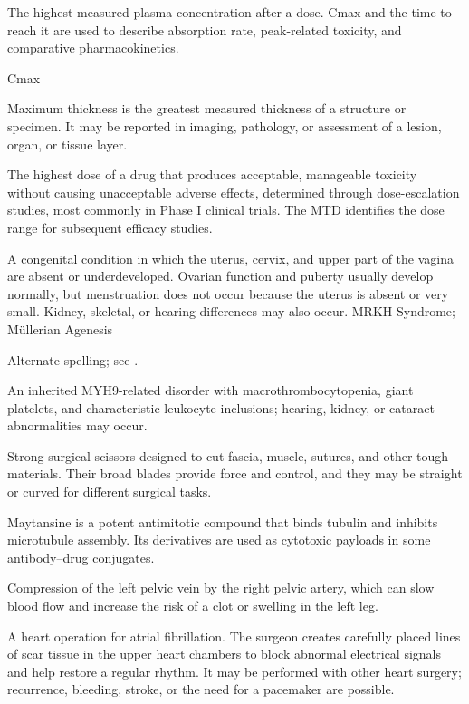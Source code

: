  The highest measured plasma concentration after a dose. Cmax and the time to reach it
are used to describe absorption rate, peak-related toxicity, and comparative
pharmacokinetics.

\synonyms
Cmax

 Maximum thickness is the greatest measured thickness of a structure or specimen. It may be reported in imaging, pathology, or assessment of a lesion, organ, or tissue layer.

 The highest dose of a drug that produces acceptable, manageable toxicity without causing
unacceptable adverse effects, determined through dose-escalation studies, most commonly
in Phase I clinical trials. The MTD identifies the dose range for subsequent efficacy
studies.

 A congenital condition in which the uterus, cervix, and upper part of the vagina are absent or underdeveloped. Ovarian function and puberty usually develop normally, but menstruation does not occur because the uterus is absent or very small. Kidney, skeletal, or hearing differences may also occur.
\synonyms
MRKH Syndrome; Müllerian Agenesis

 Alternate spelling; see .

 An inherited MYH9-related disorder with macrothrombocytopenia, giant platelets, and characteristic leukocyte inclusions; hearing, kidney, or cataract abnormalities may occur.

 Strong surgical scissors designed to cut fascia, muscle, sutures, and other tough materials. Their broad blades provide force and control, and they may be straight or curved for different surgical tasks.

 Maytansine is a potent antimitotic compound that binds tubulin and inhibits microtubule assembly. Its derivatives are used as cytotoxic payloads in some antibody--drug conjugates.

 Compression of the left pelvic vein by the right pelvic artery, which can slow blood flow and increase the risk of a clot or swelling in the left leg.

 A heart operation for atrial fibrillation. The surgeon creates carefully placed lines of scar tissue in the upper heart chambers to block abnormal electrical signals and help restore a regular rhythm. It may be performed with other heart surgery; recurrence, bleeding, stroke, or the need for a pacemaker are possible.


